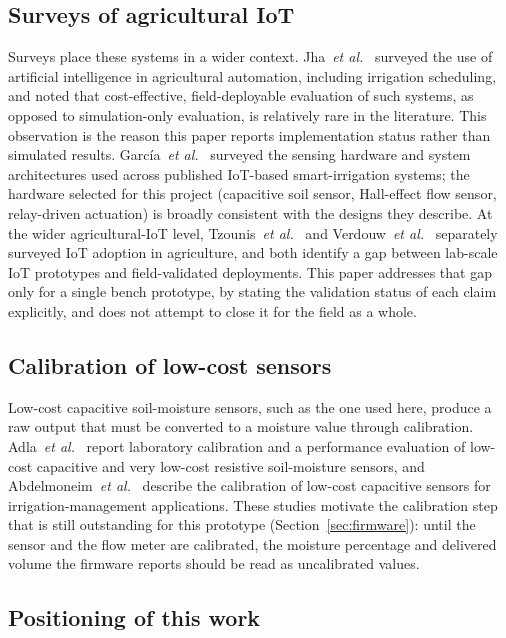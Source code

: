 \documentclass[conference]{IEEEtran}
\begin{document}
\subsection{Surveys of agricultural IoT}

Surveys place these systems in a wider context. Jha~\emph{et
al.}~\cite{jha2019comprehensive} surveyed the use of artificial intelligence
in agricultural automation, including irrigation scheduling, and noted that
cost-effective, field-deployable evaluation of such systems, as opposed to
simulation-only evaluation, is relatively rare in the literature. This
observation is the reason this paper reports implementation status rather than
simulated results. Garc\'{i}a~\emph{et al.}~\cite{garcia2020iot} surveyed the
sensing hardware and system architectures used across published IoT-based
smart-irrigation systems; the hardware selected for this project (capacitive
soil sensor, Hall-effect flow sensor, relay-driven actuation) is broadly
consistent with the designs they describe. At the wider agricultural-IoT level,
Tzounis~\emph{et al.}~\cite{tzounis2017iot} and
Verdouw~\emph{et al.}~\cite{verdouw2016iot} separately surveyed IoT adoption in
agriculture, and both identify a gap between lab-scale IoT prototypes and
field-validated deployments. This paper addresses that gap only for a single
bench prototype, by stating the validation status of each claim explicitly,
and does not attempt to close it for the field as a whole.

\subsection{Calibration of low-cost sensors}

Low-cost capacitive soil-moisture sensors, such as the one used here, produce
a raw output that must be converted to a moisture value through calibration.
Adla~\emph{et al.}~\cite{adla2020laboratory} report laboratory calibration and
a performance evaluation of low-cost capacitive and very low-cost resistive
soil-moisture sensors, and Abdelmoneim~\emph{et
al.}~\cite{abdelmoneim2025calibration} describe the calibration of low-cost
capacitive sensors for irrigation-management applications. These studies
motivate the calibration step that is still outstanding for this prototype
(Section~\ref{sec:firmware}): until the sensor and the flow meter are
calibrated, the moisture percentage and delivered volume the firmware reports
should be read as uncalibrated values.

\subsection{Positioning of this work}
\end{document}
